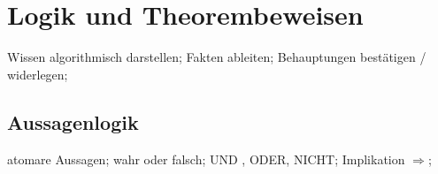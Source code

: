 \documentclass[german,color,6pt]{latex4ei/latex4ei_sheet}
\begin{document}
\columnbreak

\section{Logik und Theorembeweisen}
\begin{symbolbox}
Wissen algorithmisch darstellen; Fakten ableiten; Behauptungen bestätigen / widerlegen;
\end{symbolbox}

\begin{sectionbox}
\subsection{Aussagenlogik}
atomare Aussagen; wahr oder falsch; UND , ODER, NICHT; Implikation $\Rightarrow$;
\end{sectionbox}
\end{document}
